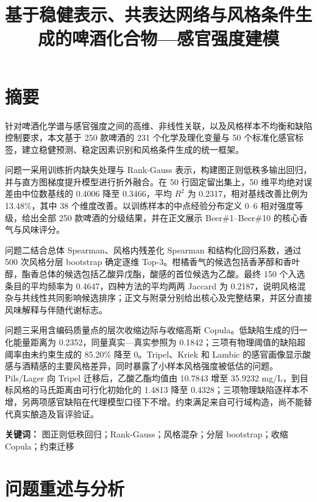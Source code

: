 \documentclass[
  chinese,
  11pt,
]{article}
\title{基于稳健表示、共表达网络与风格条件生成的啤酒化合物---感官强度建模}
\author{}
\date{}
\begin{document}
\begingroup\let\newpage\relax\maketitle\endgroup\vspace{-2em}

\section*{摘要}\label{ux6458ux8981}

针对啤酒化学谱与感官强度之间的高维、非线性关联，以及风格样本不均衡和缺陷控制要求，本文基于
250 款啤酒的 231 个化学及理化变量与 50
个标准化感官标签，建立稳健预测、稳定因素识别和风格条件生成的统一框架。

问题一采用训练折内缺失处理与 Rank-Gauss
表示，构建图正则低秩多输出回归，并与直方图梯度提升模型进行折外融合。在
50 行固定留出集上，50 维平均绝对误差由中位数基线的 0.4006 降至
0.3466，平均 \(R^2\) 为 0.2317，相对基线改善比例为 13.48\%，其中 38
个维度改善。以训练样本的中点经验分布定义 0--6 相对强度等级，给出全部 250
款啤酒的分级结果，并在正文展示 Beer\#1--Beer\#10 的核心香气与风味评分。

问题二结合总体 Spearman、风格内残差化 Spearman 和结构化回归系数，通过
500 次风格分层 bootstrap 确定逐维
Top-3。柑橘香气的候选包括香茅醇和香叶醇，酯香总体的候选包括乙酸异戊酯，酸感的首位候选为乙酸。最终
150 个入选条目的平均频率为 0.4647，四种方法的平均两两 Jaccard 为
0.2187，说明风格混杂与共线性共同影响候选排序；正文与附录分别给出核心及完整结果，并区分直接风味解释与伴随代谢标志。

问题三采用含编码质量点的层次收缩边际与收缩高斯
Copula。低缺陷生成的归一化能量距离为 0.2352，同量真实---真实参照为
0.1842；三项有物理阈值的缺陷超阈率由未约束生成的 85.20\% 降至
0。Tripel、Kriek 和 Lambic
的感官画像显示酸感与酒精感的主要风格差异，同时暴露了小样本风格强度被低估的问题。Pils/Lager
向 Tripel 迁移后，乙酸乙酯均值由 10.7843 增至 35.9232
mg/L，到目标风格的马氏距离由可行化初始化的 1.4813 降至
0.4328；三项物理缺陷逐样本不增，另两项感官缺陷在代理模型口径下不增。约束满足来自可行域构造，尚不能替代真实酿造及盲评验证。

\textbf{关键词：} 图正则低秩回归；Rank-Gauss；风格混杂；分层
bootstrap；收缩 Copula；约束迁移

\newpage
\begingroup\small\setlength{\parskip}{0pt}\tableofcontents\endgroup
\newpage

\section{问题重述与分析}\label{ux95eeux9898ux91cdux8ff0ux4e0eux5206ux6790}
\end{document}

